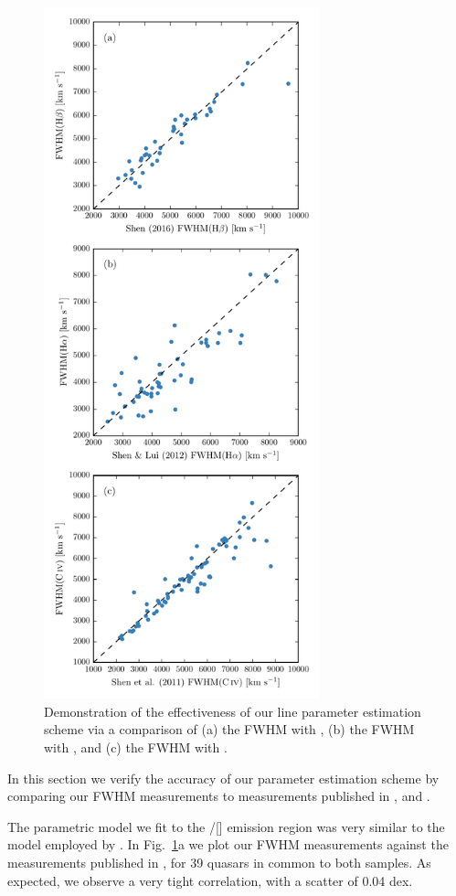 \begin{figure}
    \includegraphics[width=8cm]{figures/chapter03/shen_comparison.pdf} 
    \caption{Demonstration of the effectiveness of our line parameter estimation scheme via a comparison of (a) the \hb FWHM with \citet{shen16a}, (b) the \hb FWHM with \citet{shen12}, and (c) the  FWHM with \citet{shen11}.} 
    \label{fig:shen_comparison}
\end{figure}

In this section we verify the accuracy of our parameter estimation scheme by comparing our FWHM measurements to measurements published in \cite{shen11}, \cite{shen12} and \cite{shen16a}. 

The parametric model we fit to the \hbns/[] emission region was very similar to the model employed by \citet{shen16a}. 
In Fig.~\ref{fig:shen_comparison}a we plot our \hb FWHM measurements against the measurements published in \citet{shen16a}, for 39 quasars in common to both samples. 
As expected, we observe a very tight correlation, with a scatter of 0.04 dex. 

